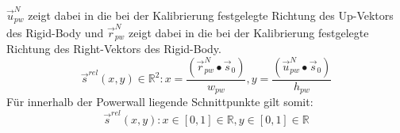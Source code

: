 \documentclass[]{article}
\newcommand{\POW}{Powerwall}
\begin{document}
$\overrightarrow{u}_{pw}^{N}$ zeigt dabei in die bei der Kalibrierung festgelegte Richtung des \glqq{}Up\grqq{}-Vektors des Rigid-Body und 
$\overrightarrow{r}_{pw}^{N}$ zeigt dabei in die bei der Kalibrierung festgelegte Richtung des \glqq{}Right\grqq{}-Vektors des Rigid-Body.
\begin{equation} \label{schnitt_relative}
    \overrightarrow{s}^{rel}(x, y) \in \mathbb{R}^{2} : x = \frac{\left( \overrightarrow{r}_{pw}^{N} \bullet \overrightarrow{s}_{0} \right) }{w_{pw}}, 
                                                        y = \frac{\left( \overrightarrow{u}_{pw}^{N} \bullet \overrightarrow{s}_{0} \right) }{h_{pw}}
\end{equation}
Für innerhalb der \POW{} liegende Schnittpunkte gilt somit:
\begin{equation} \label{schnitt_inner}
    \overrightarrow{s}^{rel}(x, y)  : x \in \left[0,1 \right] \in \mathbb{R}, y \in \left[0,1 \right] \in \mathbb{R}
\end{equation}

\end{document}
